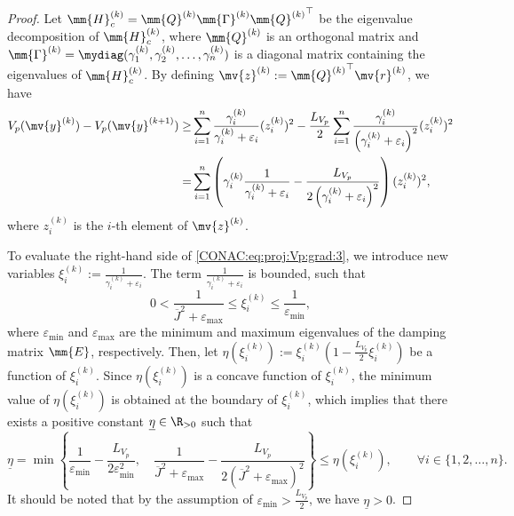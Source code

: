 \begin{proof}
  Let $\mm{H}_c^{(k)}=\mm{Q}^{(k)}\mm{\Gamma}^{(k)}{\mm{Q}^{(k)}}^\top$ be the eigenvalue decomposition of $\mm{H}_c^{(k)}$, where $\mm{Q}^{(k)}$ is an orthogonal matrix and $\mm{\Gamma}^{(k)}=\mydiag(\gamma_1^{(k)}, \gamma_2^{(k)}, \ldots, \gamma_n^{(k)})$ is a diagonal matrix containing the eigenvalues of $\mm{H}_c^{(k)}$.
  By defining $\mv{z}^{(k)}:={\mm{Q}^{(k)}}^\top\mv{r}^{(k)}$, we have
  \begin{align}
    \label{CONAC:eq:proj:Vp:grad:3} \nonumber
    V_p(\mv{y}^{(k)})
    -
    V_p(\mv{y}^{(k+1)})
    \ge &
    \sum_{i=1}^{n}
    \frac{\gamma_i^{(k)}}{\gamma_i^{(k)} + \varepsilon_i}
    (z_i^{(k)})^2
    -
    \frac{L_{V_p}}{2}
    \sum_{i=1}^{n}
    \frac{
      \gamma_i^{(k)}
    }{
      \left(
        \gamma_i^{(k)} + \varepsilon_i
      \right)^2
    }
    (z_i^{(k)})^2
    \\ 
    = &
    \sum_{i=1}^{n}
    \left(
      \gamma_i^{(k)}
      \frac{1}{\gamma_i^{(k)}+\varepsilon_i}
      -
      \frac{
        L_{V_p}
      }{
        2
        \left(
          \gamma_i^{(k)}+\varepsilon_i
        \right)^2
      }
    \right)
    (z_i^{(k)})^2
    ,
  \end{align}
  where $z_i^{(k)}$ is the $i$-th element of $\mv{z}^{(k)}$.

  To evaluate the right-hand side of \eqref{CONAC:eq:proj:Vp:grad:3}, we introduce new variables $\xi_i^{(k)}:=\frac{1}{\gamma_i^{(k)}+\varepsilon_i}$.
  The term $\frac{1}{\gamma_i^{(k)}+\varepsilon_i}$ is bounded, such that
  \begin{equation}
    0
    <
    \frac{1}{\overline{J}^2+\varepsilon_{\max}}
    \le
    \xi_i^{(k)}
    \le
    \frac{1}{\varepsilon_{\min}}
    ,
  \end{equation}
  where $\varepsilon_{\min}$ and $\varepsilon_{\max}$ are the minimum and maximum eigenvalues of the damping matrix $\mm{E}$, respectively.
  Then, let 
  $
    \eta(\xi_i^{(k)})
    :=
    \xi_i^{(k)}
    \left(
      1 - \frac{L_{V_p}}{2}\xi_i^{(k)}
    \right)
  $ be a function of $\xi_i^{(k)}$.
  Since $\eta(\xi_i^{(k)})$ is a concave function of $\xi_i^{(k)}$, the minimum value of $\eta(\xi_i^{(k)})$ is obtained at the boundary of $\xi_i^{(k)}$, which implies that there exists a positive constant $\underline{\eta}\in\R_{>0}$ such that
  \begin{equation}
    \underline{\eta}
    =
    \min
    \left\{
      \frac{1}{\varepsilon_{\min}}
      -
      \frac{L_{V_p}}{2\varepsilon_{\min}^2}
      ,\quad
      \frac{1}{\overline{J}^2+\varepsilon_{\max}}
      -
      \frac{L_{V_p}}{2(\overline{J}^2+\varepsilon_{\max})^2}
    \right\}
    \le
    \eta(\xi_i^{(k)})
    ,
    \qquad
    \forall i\in\{1,2,\ldots,n\}
    .
  \end{equation}
  It should be noted that by the assumption of $\varepsilon_{\min}>\frac{L_{V_p}}{2}$, we have $\underline{\eta}>0$.


\end{proof}
